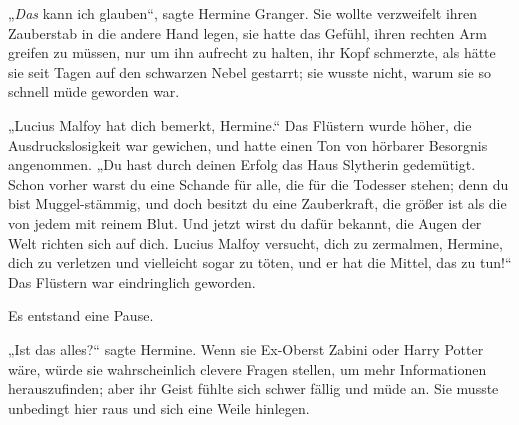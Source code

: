 „\emph{Das} kann ich glauben“, sagte Hermine Granger. Sie wollte verzweifelt ihren Zauberstab in die andere Hand legen, sie hatte das Gefühl, ihren rechten Arm greifen zu müssen, nur um ihn aufrecht zu halten, ihr Kopf schmerzte, als hätte sie seit Tagen auf den schwarzen Nebel gestarrt; sie wusste nicht, warum sie so schnell müde geworden war.

„Lucius Malfoy hat dich bemerkt, Hermine.“ Das Flüstern wurde höher, die Ausdruckslosigkeit war gewichen, und hatte einen Ton von hörbarer Besorgnis angenommen.
„Du hast durch deinen Erfolg das Haus Slytherin gedemütigt. Schon vorher warst du eine Schande für alle, die für die Todesser stehen; denn du bist Muggel-stämmig, und doch besitzt du eine Zauberkraft, die größer ist als die von jedem mit reinem Blut. Und jetzt wirst du dafür bekannt, die Augen der Welt richten sich auf dich. Lucius Malfoy versucht, dich zu zermalmen, Hermine, dich zu verletzen und vielleicht sogar zu töten, und er hat die Mittel, das zu tun!“ Das Flüstern war eindringlich geworden.

Es entstand eine Pause.

„Ist das alles?“ sagte Hermine. Wenn sie Ex-Oberst Zabini oder Harry Potter wäre, würde sie wahrscheinlich clevere Fragen stellen, um mehr Informationen herauszufinden; aber ihr Geist fühlte sich schwer fällig und müde an. Sie musste unbedingt hier raus und sich eine Weile hinlegen.


